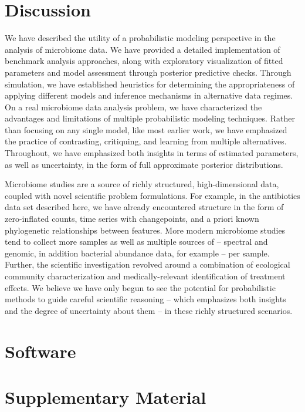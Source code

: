 \documentclass[oupdraft]{bio}
\begin{document}
\section{Discussion}

We have described the utility of a probabilistic modeling perspective in the
analysis of microbiome data. We have provided a detailed implementation of benchmark
analysis approaches, along with exploratory visualization of fitted parameters
and model assessment through posterior predictive checks. Through simulation, we
have established heuristics for determining the appropriateness of applying
different models and inference mechanisms in alternative data regimes. On a real
microbiome data analysis problem, we have characterized the advantages and
limitations of multiple probabilistic modeling techniques. Rather than focusing
on any single model, like most earlier work, we have emphasized the practice of
contrasting, critiquing, and learning from multiple alternatives. Throughout, we
have emphasized both insights in terms of estimated parameters, as well as
uncertainty, in the form of full approximate posterior distributions.

Microbiome studies are a source of richly structured, high-dimensional data,
coupled with novel scientific problem formulations. For example, in the
antibiotics data set described here, we have already encountered structure in
the form of zero-inflated counts, time series with changepoints, and a priori
known phylogenetic relationships between features. More modern microbiome
studies tend to collect more samples as well as multiple sources of -- spectral
and genomic, in addition bacterial abundance data, for example -- per sample.
Further, the scientific investigation revolved around a combination of
ecological community characterization and medically-relevant identification of
treatment effects. We believe we have only begun to see the potential for
probabilistic methods to guide careful scientific reasoning -- which emphasizes
both insights and the degree of uncertainty about them -- in these richly
structured scenarios.

\section{Software}

\section{Supplementary Material}
\end{document}
